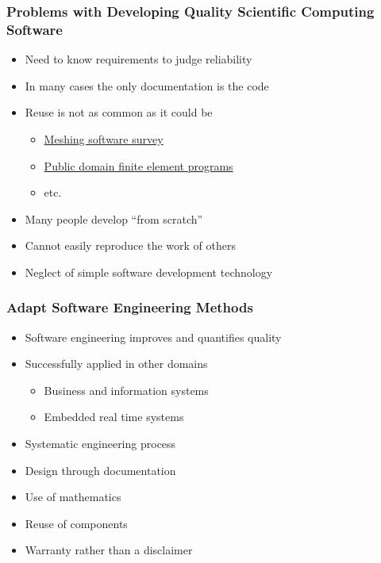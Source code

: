 \documentclass[t,12pt,numbers,fleqn]{beamer}
\begin{document}

\begin{frame}

\frametitle{Problems with Developing Quality Scientific Computing Software}

\begin{itemize}

\item Need to know requirements to judge reliability
\item In many cases the only documentation is the code
\item Reuse is not as common as it could be
\begin{itemize}
\item \href{http://www.andrew.cmu.edu/user/sowen/softsurv.html}{\alert{Meshing software survey}}
\item \href{http://www.engr.usask.ca/~macphed/finite/fe_resources/node137.html}{\alert{Public domain finite element
programs}}
\item etc.
\end{itemize}
\item Many people develop ``from scratch''
\item Cannot easily reproduce the work of others
\item Neglect of simple software development technology~\cite{Wilson2006} 

\end{itemize}

\end{frame}


\begin{frame}

\frametitle{Adapt Software Engineering Methods}

\begin{itemize}

\item Software engineering improves and quantifies quality %
\item Successfully applied in other domains
\begin{itemize}
\item Business and information systems
\item Embedded real time systems
\end{itemize}
\item Systematic engineering process
\item Design through documentation
\item Use of mathematics
\item Reuse of components
\item Warranty rather than a disclaimer %

\end{itemize}

\end{frame}
\end{document}

